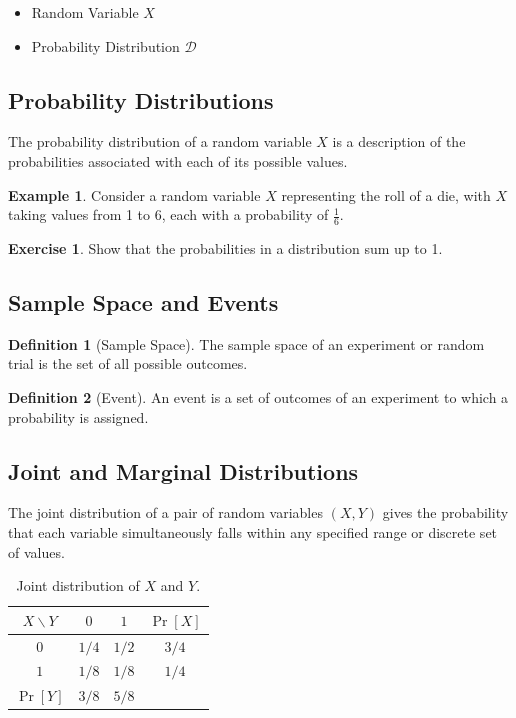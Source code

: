 \documentclass[12pt,openany]{book}
\theoremstyle{definition}
\newtheorem{definition}{Definition}[chapter]
\newtheorem{exercise}{Exercise}[chapter]
\newtheorem{example}{Example}[chapter]
\begin{document}
	\begin{itemize}
		\item Random Variable $X$
		\item Probability Distribution $\mathcal{D}$
	\end{itemize}
	
	\subsection{Probability Distributions}
	The probability distribution of a random variable $X$ is a description of the probabilities associated with each of its possible values.
	
	\begin{example}
		Consider a random variable $X$ representing the roll of a die, with $X$ taking values from 1 to 6, each with a probability of $\frac{1}{6}$.
	\end{example}
	
	\begin{exercise}
		Show that the probabilities in a distribution sum up to 1.
	\end{exercise}
	
	\subsection{Sample Space and Events}
	\begin{definition}[Sample Space]
		The sample space of an experiment or random trial is the set of all possible outcomes.
	\end{definition}
	
	\begin{definition}[Event]
		An event is a set of outcomes of an experiment to which a probability is assigned.
	\end{definition}
	
	\subsection{Joint and Marginal Distributions}
	The joint distribution of a pair of random variables $(X, Y)$ gives the probability that each variable simultaneously falls within any specified range or discrete set of values.
	
	\begin{table}[ht]
		\centering
		\begin{tabular}{c|cc|c}
			\toprule
			$X\backslash Y$ & $0$ & $1$ & $\Pr[X]$ \\
			\midrule
			$0$ & $1/4$ & $1/2$ & $3/4$ \\
			$1$ & $1/8$ & $1/8$ & $1/4$ \\
			\midrule
			$\Pr[Y]$ & $3/8$ & $5/8$ & \\
			\bottomrule
		\end{tabular}
		\caption{Joint distribution of $X$ and $Y$.}
		\label{tab:joint_dist}
	\end{table}
	
\end{document}
